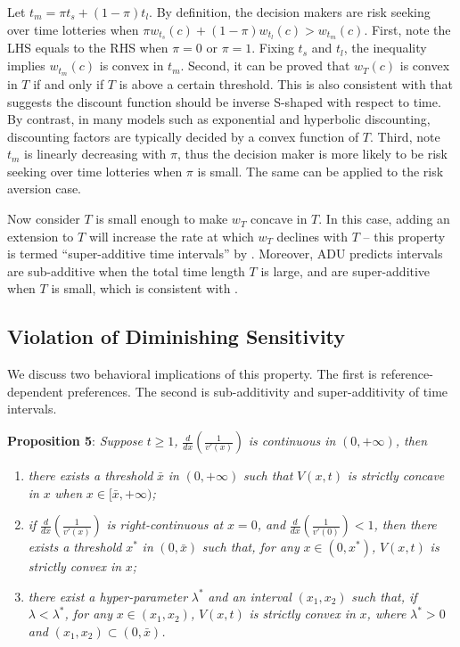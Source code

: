 \documentclass[
  12pt,
]{article}
\begin{document}
Let \(t_m = \pi t_s +(1-\pi) t_l\). By definition, the decision makers
are risk seeking over time lotteries when
\(\pi w_{t_s}(c)+(1-\pi)w_{t_l}(c)>w_{t_m}(c)\). First, note the LHS
equals to the RHS when \(\pi=0\) or \(\pi=1\). Fixing \(t_s\) and
\(t_l\), the inequality implies \(w_{t_m}(c)\) is convex in \(t_m\).
Second, it can be proved that \(w_T(c)\) is convex in \(T\) if and only
if \(T\) is above a certain threshold. This is also consistent with
\citet{takeuchi_non-parametric_2011} that suggests the discount function
should be inverse S-shaped with respect to time. By contrast, in many
models such as exponential and hyperbolic discounting, discounting
factors are typically decided by a convex function of \(T\). Third, note
\(t_m\) is linearly decreasing with \(\pi\), thus the decision maker is
more likely to be risk seeking over time lotteries when \(\pi\) is
small. The same can be applied to the risk aversion case.

Now consider \(T\) is small enough to make \(w_T\) concave in \(T\). In
this case, adding an extension to \(T\) will increase the rate at which
\(w_T\) declines with \(T\) -- this property is termed ``super-additive
time intervals'' by \citet{read_is_2001}. Moreover, ADU predicts
intervals are sub-additive when the total time length \(T\) is large,
and are super-additive when \(T\) is small, which is consistent with
\citet{scholten_discounting_2006}.

\hypertarget{violation-of-diminishing-sensitivity}{%
\subsection{Violation of Diminishing
Sensitivity}\label{violation-of-diminishing-sensitivity}}

We discuss two behavioral implications of this property. The first is
reference-dependent preferences. The second is sub-additivity and
super-additivity of time intervals.

\textbf{Proposition 5}: \emph{Suppose} \(t\geq1\)\emph{,}
\(\frac{d}{dx}\left(\frac{1}{v'(x)}\right)\) \emph{is continuous in}
\((0,+\infty)\)\emph{, then}

\begin{enumerate}
\def\labelenumi{\arabic{enumi})}
\item
  \emph{there exists a threshold} \(\bar{x}\) \emph{in} \((0,+\infty)\)
  \emph{such that} \(V(x,t)\) \emph{is strictly concave in} \(x\)
  \emph{when} \(x\in [\bar{x},+\infty)\)\emph{;}
\item
  \emph{if} \(\frac{d}{dx}\left(\frac{1}{v'(x)}\right)\) \emph{is
  right-continuous at} \(x=0\)\emph{, and}
  \(\frac{d}{dx}\left(\frac{1}{v'(0)}\right)<1\)\emph{, then there
  exists a threshold} \(x^*\) \emph{in} \((0, \bar{x})\) \emph{such
  that, for any} \(x\in (0,x^*)\)\emph{,} \(V(x,t)\) \emph{is strictly
  convex in} \(x\)\emph{;}
\item
  \emph{there exist a hyper-parameter} \(\lambda^*\) \emph{and an
  interval} \((x_1,x_2)\) \emph{such that, if}
  \(\lambda<\lambda^*\)\emph{, for any} \(x\in(x_1,x_2)\)\emph{,}
  \(V(x,t)\) \emph{is strictly convex in} \(x\)\emph{, where}
  \(\lambda^*>0\) \emph{and} \((x_1,x_2)\subset(0,\bar{x})\)\emph{.}
\end{enumerate}
\end{document}
